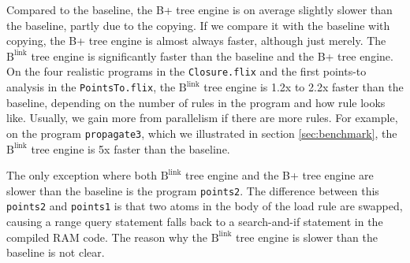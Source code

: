 \documentclass[11pt]{report}
\theoremstyle{definition}
\begin{document}
Compared to the baseline, the B+ tree engine is on average slightly slower than the baseline, partly due to the copying. If we compare it with the baseline with copying, the B+ tree engine is almost always faster, although just merely. The $\text{B}^{\text{link}}$ tree engine is significantly faster than the baseline and the B+ tree engine. On the four realistic programs in the \texttt{Closure.flix} and the first points-to analysis in the \texttt{PointsTo.flix}, the $\text{B}^{\text{link}}$ tree engine is 1.2x to 2.2x faster than the baseline, depending on the number of rules in the program and how rule looks like. Usually, we gain more from parallelism if there are more rules. For example, on the program \texttt{propagate3}, which we illustrated in section \ref{sec:benchmark}, the $\text{B}^{\text{link}}$ tree engine is 5x faster than the baseline.

The only exception where both $\text{B}^{\text{link}}$ tree engine and the B+ tree engine are slower than the baseline is the program \texttt{points2}. The difference between this \texttt{points2} and \texttt{points1} is that two atoms in the body of the load rule are swapped, causing a range query statement falls back to a search-and-if statement in the compiled RAM code. The reason why the $\text{B}^{\text{link}}$ tree engine is slower than the baseline is not clear.
\end{document}

